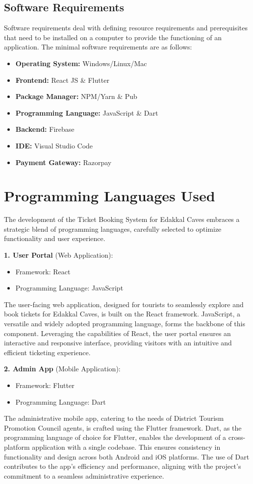 \documentclass[12pt,a4paper]{report}
\begin{document}
\subsection{Software Requirements}
Software requirements deal with defining resource requirements and prerequisites that need to be installed on a computer to provide the functioning of an application. The minimal software requirements are as follows:

\begin{itemize}
    \item \textbf{Operating System:} Windows/Linux/Mac
    \item \textbf{Frontend:} React JS \& Flutter
    \item \textbf{Package Manager:} NPM/Yarn \& Pub
    \item \textbf{Programming Language:} JavaScript \& Dart
    \item \textbf{Backend:} Firebase
    \item \textbf{IDE:} Visual Studio Code
    \item \textbf{Payment Gateway:} Razorpay
\end{itemize}

\section{Programming Languages Used}

The development of the Ticket Booking System for Edakkal Caves embraces a strategic blend of programming languages, carefully selected to optimize functionality and user experience.

\textbf{1. User Portal} (Web Application):

\begin{itemize}
    \item Framework: React
    \item Programming Language: JavaScript
\end{itemize}

The user-facing web application, designed for tourists to seamlessly explore and book tickets for Edakkal Caves, is built on the React framework. JavaScript, a versatile and widely adopted programming language, forms the backbone of this component. Leveraging the capabilities of React, the user portal ensures an interactive and responsive interface, providing visitors with an intuitive and efficient ticketing experience.

\textbf{2. Admin App} (Mobile Application):
\begin{itemize}
    \item Framework: Flutter
    \item Programming Language: Dart
\end{itemize}
The administrative mobile app, catering to the needs of District Tourism Promotion Council agents, is crafted using the Flutter framework. Dart, as the programming language of choice for Flutter, enables the development of a cross-platform application with a single codebase. This ensures consistency in functionality and design across both Android and iOS platforms. The use of Dart contributes to the app's efficiency and performance, aligning with the project's commitment to a seamless administrative experience.
\end{document}
